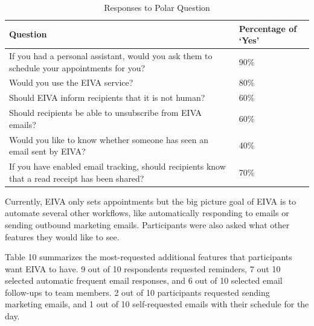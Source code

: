 \documentclass{article}
\begin{document}
\begin{table}[!htb]
	\begin{minipage}{1\linewidth}
		\caption{Responses to Polar Question}
		\centering
		\begin{tabular}{p{10cm}p{2cm}}
			\hline
			\textbf{Question}                                                                               & \textbf{Percentage of `Yes'} \\
			\hline
			If you had a personal assistant, would you ask them to schedule your appointments for you?      & 90\%                         \\
			Would you use the EIVA service?                                                                 & 80\%                         \\
			Should EIVA inform recipients that it is not human?                                             & 60\%                         \\
			Should recipients be able to unsubscribe from EIVA emails?                                      & 60\%                         \\
			Would you like to know whether someone has seen an email sent by EIVA?                          & 40\%                         \\
			If you have enabled email tracking, should recipients know that a read receipt has been shared? & 70\%                         \\
			\hline
		\end{tabular}
	\end{minipage}%
\end{table}

Currently, EIVA only sets appointments but the big picture goal of EIVA is to automate several other workflows, like automatically responding to emails or sending outbound marketing emails. Participants were also asked what other features they would like to see.

Table 10 summarizes the most-requested additional features that participants want EIVA to have. 9 out of 10 respondents requested reminders, 7 out 10 selected automatic frequent email responses, and 6 out of 10 selected email follow-ups to team members. 2 out of 10 participants requested sending marketing emails, and 1 out of 10 self-requested emails with their schedule for the day.
\end{document}
